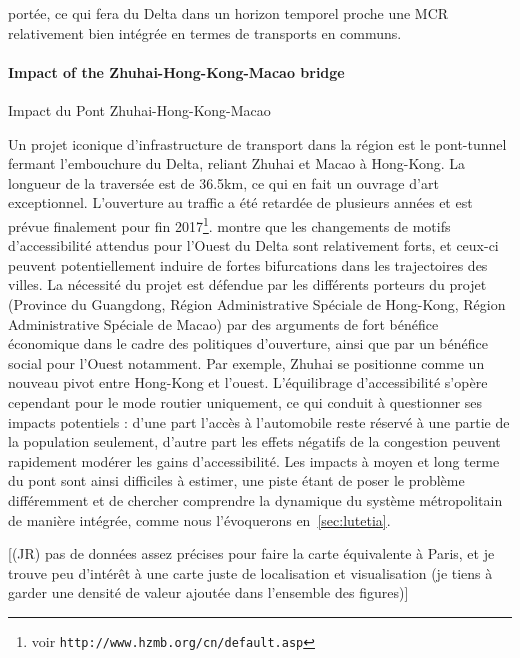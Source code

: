 {portée, ce qui fera du Delta dans un horizon temporel proche une MCR relativement bien intégrée en termes de transports en communs.
}


\paragraph{Impact of the Zhuhai-Hong-Kong-Macao bridge}{Impact du Pont Zhuhai-Hong-Kong-Macao}

Un projet iconique d'infrastructure de transport dans la région est le pont-tunnel fermant l'embouchure du Delta, reliant Zhuhai et Macao à Hong-Kong. La longueur de la traversée est de 36.5km, ce qui en fait un ouvrage d'art exceptionnel. L'ouverture au traffic a été retardée de plusieurs années et est prévue finalement pour fin 2017\footnote{voir \texttt{http://www.hzmb.org/cn/default.asp}}. \cite{zhou2016medium} montre que les changements de motifs d'accessibilité attendus pour l'Ouest du Delta sont relativement forts, et ceux-ci peuvent potentiellement induire de fortes bifurcations dans les trajectoires des villes. La nécessité du projet est défendue par les différents porteurs du projet (Province du Guangdong, Région Administrative Spéciale de Hong-Kong, Région Administrative Spéciale de Macao) par des arguments de fort bénéfice économique dans le cadre des politiques d'ouverture, ainsi que par un bénéfice social pour l'Ouest notamment. Par exemple, Zhuhai se positionne comme un nouveau pivot entre Hong-Kong et l'ouest. L'équilibrage d'accessibilité s'opère cependant pour le mode routier uniquement, ce qui conduit à questionner ses impacts potentiels : d'une part l'accès à l'automobile reste réservé à une partie de la population seulement, d'autre part les effets négatifs de la congestion peuvent rapidement modérer les gains d'accessibilité. Les impacts à moyen et long terme du pont sont ainsi difficiles à estimer, une piste étant de poser le problème différemment et de chercher comprendre la dynamique du système métropolitain de manière intégrée, comme nous l'évoquerons en~\ref{sec:lutetia}.


[(JR) pas de données assez précises pour faire la carte équivalente à Paris, et je trouve peu d'intérêt à une carte juste de localisation et visualisation (je tiens à garder une densité de valeur ajoutée dans l'ensemble des figures)]







